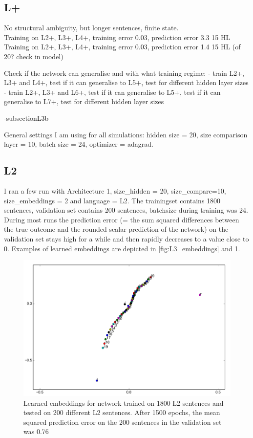 \documentclass{article}
\begin{document}
\subsection{L+}

No structural ambiguity, but longer sentences, finite state.\\

Training on L2+, L3+, L4+, training error 0.03, prediction error 3.3 15 HL
Training on L2+, L3+, L4+, training error 0.03, prediction error 1.4 15 HL (of 20? check in model)

Check if the network can generalise and with what training regime:
- train L2+, L3+ and L4+, test if it can generalise to L5+, test for different hidden layer sizes
- train L2+, L3+ and L6+, test if it can generalise to L5+, test if it can generalise to L7+, test for different hidden layer sizes

-subsection{L3b}

General settings I am using for all simulations: hidden size = 20, size comparison layer = 10, batch size = 24, optimizer = adagrad.


\subsection{L2}

I ran a few run with Architecture 1, size\_hidden = 20, size\_compare=10, size\_embeddings = 2 and language = L2. 
The trainingset contains 1800 sentences, validation set contains 200 sentences, batchsize during training was 24. 
During most runs the prediction error (= the sum squared differences between the true outcome and the rounded scalar prediction of the network) on the validation set stays high for a while and then rapidly decreases to a value close to 0. 
Examples of learned embeddings are depicted in \ref{fig:L3_embeddings} and \ref{fig:L3_embeddings2}.

\begin{figure}[!ht]
        \includegraphics[scale=0.5]{L2_embeddings2.png}
        \caption{Learned embeddings for network trained on 1800 L2 sentences and tested on 200 different L2 sentences. After 1500 epochs, the mean squared prediction error on the 200 sentences in the validation set was 0.76}\label{fig:L3_embeddings2}
\end{figure}
\end{document}
